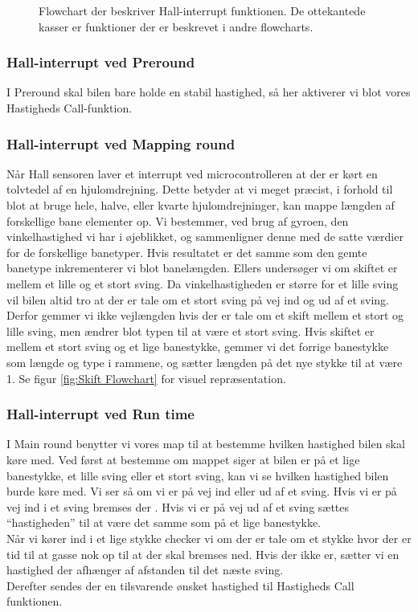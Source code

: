 {\begin{figure}
\begin{center}
\end{center}
\caption{Flowchart der beskriver Hall-interrupt funktionen. De ottekantede kasser er funktioner der er beskrevet i andre flowcharts.}
\label{fig:Hall Flowchart}
\end{figure}
\clearpage
}


\subsubsection{Hall-interrupt ved Preround}

I Preround skal bilen bare holde en stabil hastighed, så her aktiverer vi blot vores Hastigheds Call-funktion.

\subsubsection{Hall-interrupt ved Mapping round}

Når Hall sensoren laver et interrupt ved microcontrolleren at der er kørt en tolvtedel af en hjulomdrejning. Dette betyder at vi meget præcist, i forhold til blot at bruge hele, halve, eller kvarte hjulomdrejninger, kan mappe længden af forskellige bane elementer op. Vi bestemmer, ved brug af gyroen, den vinkelhastighed vi har i øjeblikket, og sammenligner denne med de satte værdier for de forskellige banetyper. Hvis resultatet er det samme som den gemte banetype inkrementerer vi blot banelængden. Ellers undersøger vi om skiftet er mellem et lille og et stort sving. Da vinkelhastigheden er større for et lille sving vil bilen altid tro at der er tale om et stort sving på vej ind og ud af et sving. Derfor gemmer vi ikke vejlængden hvis der er tale om et skift mellem et stort og lille sving, men ændrer blot typen til at være et stort sving. Hvis skiftet er mellem et stort sving og et lige banestykke, gemmer vi det forrige banestykke som længde og type i rammene, og sætter længden på det nye stykke til at være 1. Se figur \ref{fig:Skift Flowchart} for visuel repræsentation.

\subsubsection{Hall-interrupt ved Run time}

I Main round benytter vi vores map til at bestemme hvilken hastighed bilen skal køre med. Ved først at bestemme om mappet siger at bilen er på et lige banestykke, et lille sving eller et stort sving, kan vi se hvilken hastighed bilen burde køre med. Vi ser så om vi er på vej ind eller ud af et sving. Hvis vi er på vej ind i et sving bremses der . Hvis vi er på vej ud af et sving sættes ``hastigheden'' til at være det samme som på et lige banestykke.
\\
Når vi kører ind i et lige stykke checker vi om der er tale om et stykke hvor der er tid til at gasse nok op til at der skal bremses ned. Hvis der ikke er, sætter vi en hastighed der afhænger af afstanden til det næste sving.
\\
 Derefter sendes der en tilsvarende ønsket hastighed til Hastigheds Call funktionen.